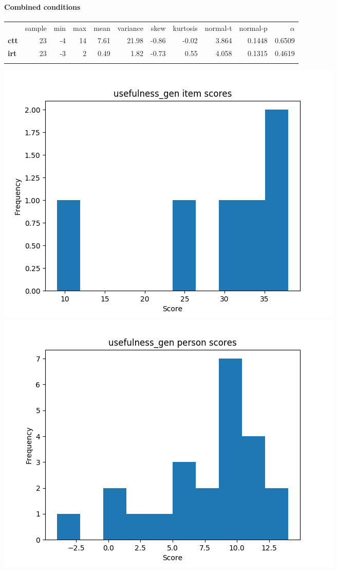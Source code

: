 \documentclass[]{article}
\begin{document}
\FloatBarrier
\paragraph{Combined conditions}\label{combined-conditions-3}

\begin{longtable}[c]{@{}lrrrrrrrrrr@{}}
\toprule\addlinespace
& sample & min & max & mean & variance & skew & kurtosis & normal-t &
normal-p & $\alpha$
\\\addlinespace
\midrule\endhead
\textbf{ctt} & 23 & -4 & 14 & 7.61 & 21.98 & -0.86 & -0.02 & 3.864 &
0.1448 & 0.6509
\\\addlinespace
\textbf{irt} & 23 & -3 & 2 & 0.49 & 1.82 & -0.73 & 0.55 & 4.058 & 0.1315
& 0.4619
\\\addlinespace
\bottomrule
\end{longtable}

\includegraphics{usefulness_gen_diff.png}
\includegraphics{usefulness_gen_abil.png}
\end{document}
